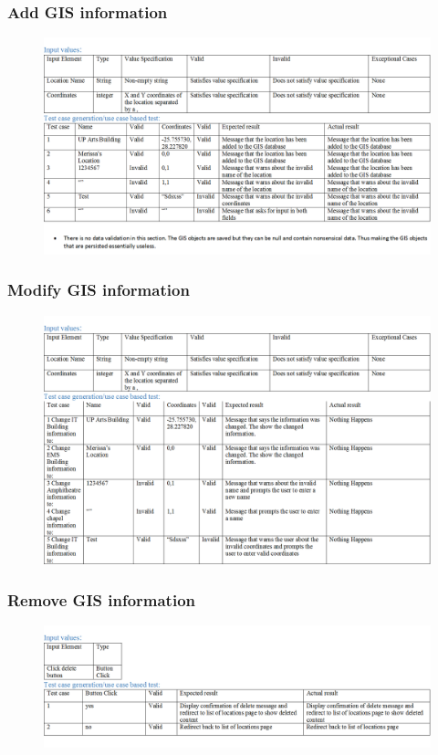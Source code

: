 \documentclass[english]{article}
\begin{document}
\subsubsection{Add GIS information}
\begin{figure}[ht!]
\hspace*{-2.5cm}
\includegraphics[width=180mm]{AddGISInformation.png}
\end{figure}
\subsubsection{Modify GIS information}
\begin{figure}[H]
\label{tab:example}
\hspace*{-2.5cm}
\includegraphics[width=180mm]{ModifyGISInformation.png}
\end{figure}
\subsubsection{Remove GIS information}
\begin{figure}[ht!]
\hspace*{-2.5cm}
\includegraphics[width=180mm]{DeleteGISInformation.png}
\end{figure}
\end{document}
